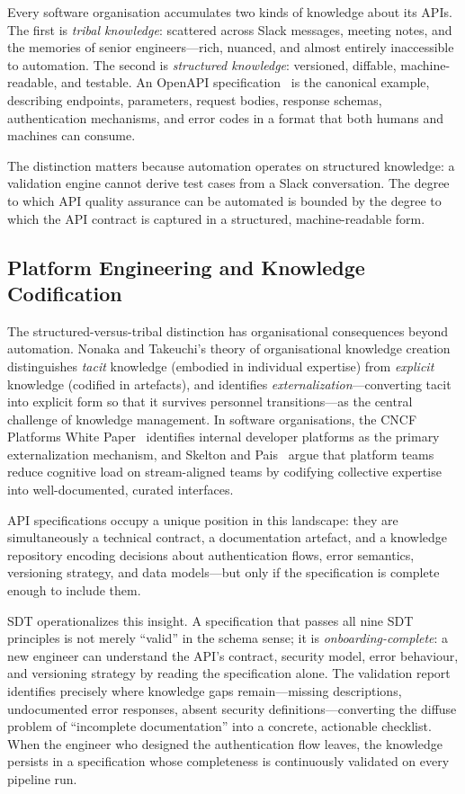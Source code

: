 Every software organisation accumulates two kinds of knowledge about its APIs. The first is \textit{tribal knowledge}: scattered across Slack messages, meeting notes, and the memories of senior engineers---rich, nuanced, and almost entirely inaccessible to automation. The second is \textit{structured knowledge}: versioned, diffable, machine-readable, and testable. An OpenAPI specification~\cite{openapi} is the canonical example, describing endpoints, parameters, request bodies, response schemas, authentication mechanisms, and error codes in a format that both humans and machines can consume.

The distinction matters because automation operates on structured knowledge: a validation engine cannot derive test cases from a Slack conversation. The degree to which API quality assurance can be automated is bounded by the degree to which the API contract is captured in a structured, machine-readable form.

\subsection{Platform Engineering and Knowledge Codification}
\label{subsec:platform-knowledge}

The structured-versus-tribal distinction has organisational consequences beyond automation. Nonaka and Takeuchi's theory of organisational knowledge creation~\cite{nonaka-knowledge} distinguishes \textit{tacit} knowledge (embodied in individual expertise) from \textit{explicit} knowledge (codified in artefacts), and identifies \textit{externalization}---converting tacit into explicit form so that it survives personnel transitions---as the central challenge of knowledge management. In software organisations, the CNCF Platforms White Paper~\cite{cncf-platforms} identifies internal developer platforms as the primary externalization mechanism, and Skelton and Pais~\cite{team-topologies} argue that platform teams reduce cognitive load on stream-aligned teams by codifying collective expertise into well-documented, curated interfaces.

API specifications occupy a unique position in this landscape: they are simultaneously a technical contract, a documentation artefact, and a knowledge repository encoding decisions about authentication flows, error semantics, versioning strategy, and data models---but only if the specification is complete enough to include them.

SDT operationalizes this insight. A specification that passes all nine SDT principles is not merely ``valid'' in the schema sense; it is \textit{onboarding-complete}: a new engineer can understand the API's contract, security model, error behaviour, and versioning strategy by reading the specification alone. The validation report identifies precisely where knowledge gaps remain---missing descriptions, undocumented error responses, absent security definitions---converting the diffuse problem of ``incomplete documentation'' into a concrete, actionable checklist. When the engineer who designed the authentication flow leaves, the knowledge persists in a specification whose completeness is continuously validated on every pipeline run.

